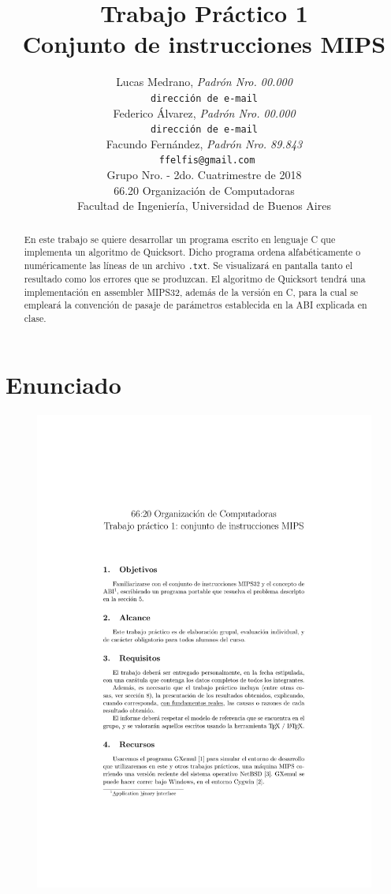 \documentclass[a4paper, 12pt]{article}
\title{		\textbf{Trabajo Práctico 1}\\
			\textbf{Conjunto de instrucciones MIPS}
			}
\author{	Lucas Medrano, \textit{Padrón Nro. 00.000}                     	\\
            \texttt{ dirección de e-mail }                           		\\
            Federico Álvarez, \textit{Padrón Nro. 00.000}                 	\\
            \texttt{ dirección de e-mail }                                 	\\
            Facundo Fernández, \textit{Padrón Nro. 89.843}              	\\
            \texttt{ ffelfis@gmail.com}                                   	\\[2.5ex]
            \normalsize{Grupo Nro. \quad - 2do. Cuatrimestre de 2018}      	\\
            \normalsize{66.20 Organización de Computadoras}               	\\
            \normalsize{Facultad de Ingeniería, Universidad de Buenos Aires}\\
       }
\date{}
\begin{document}
	\lstset{inputencoding=utf8/latin1} %
	\maketitle
	\thispagestyle{empty}
	\begin{abstract}
		En este trabajo se quiere desarrollar un programa escrito en lenguaje C que implementa un algoritmo de Quicksort. Dicho programa ordena alfabéticamente o numéricamente las líneas de un archivo \texttt{.txt}. Se visualizará en pantalla tanto el resultado como los errores que se produzcan. El algoritmo de Quicksort tendrá una implementación en assembler MIPS32, además de la versión en C, para la cual se empleará la convención de pasaje de parámetros establecida en la ABI explicada en clase.
	\end{abstract}
	
	\pagebreak
	\thispagestyle{empty}
	\tableofcontents
	\newpage
	
	\setcounter{page}{1}
	
	\section{Enunciado}
	\begin{figure}[H]
		\centering
		\includegraphics[scale=1, page = 1, clip, trim=20mm 36mm 20mm 35mm]{files/enunciado.pdf}
	\end{figure}
	
\end{document}
